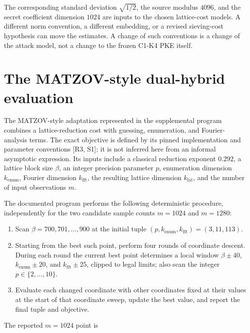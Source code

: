 \documentclass[
  11pt,
  a4paper,
  oneside]{report}
\providecommand{\tightlist}{%
  \setlength{\itemsep}{0pt}\setlength{\parskip}{0pt}}
\begin{document}
The corresponding standard deviation \(\sqrt{1/2}\), the source modulus
\(4096\), and the secret coefficient dimension \(1024\) are inputs to
the chosen lattice-cost models. A different norm convention, a different
embedding, or a revised sieving-cost hypothesis can move the estimates.
A change of such conventions is a change of the attack model, not a
change to the frozen C1-K4 PKE itself.

\section{The MATZOV-style dual-hybrid
evaluation}\label{the-matzov-style-dual-hybrid-evaluation}

The MATZOV-style adaptation represented in the supplemental program
combines a lattice-reduction cost with guessing, enumeration, and
Fourier-analysis terms. The exact objective is defined by its pinned
implementation and parameter conventions {[}R3, S1{]}; it is not
inferred here from an informal asymptotic expression. Its inputs include
a classical reduction exponent \(0.292\), a lattice block size
\(\beta\), an integer precision parameter \(p\), enumeration dimension
\(k_{\mathrm{enum}}\), Fourier dimension \(k_{\mathrm{fft}}\), the
resulting lattice dimension \(k_{\mathrm{lat}}\), and the number of
input observations \(m\).

The documented program performs the following deterministic procedure,
independently for the two candidate sample counts \(m=1024\) and
\(m=1280\):

\begin{enumerate}
\def\labelenumi{\arabic{enumi}.}
\tightlist
\item
  Scan \(\beta=700,701,\ldots,900\) at the initial tuple
  \((p,k_{\mathrm{enum}},k_{\mathrm{fft}})=(3,11,113)\).
\item
  Starting from the best such point, perform four rounds of coordinate
  descent. During each round the current best point determines a local
  window \(\beta\pm40\), \(k_{\mathrm{enum}}\pm20\), and
  \(k_{\mathrm{fft}}\pm25\), clipped to legal limits; also scan the
  integer \(p\in\{2,\ldots,10\}\).
\item
  Evaluate each changed coordinate with other coordinates fixed at their
  values at the start of that coordinate sweep, update the best value,
  and report the final tuple and objective.
\end{enumerate}

The reported \(m=1024\) point is
\end{document}
